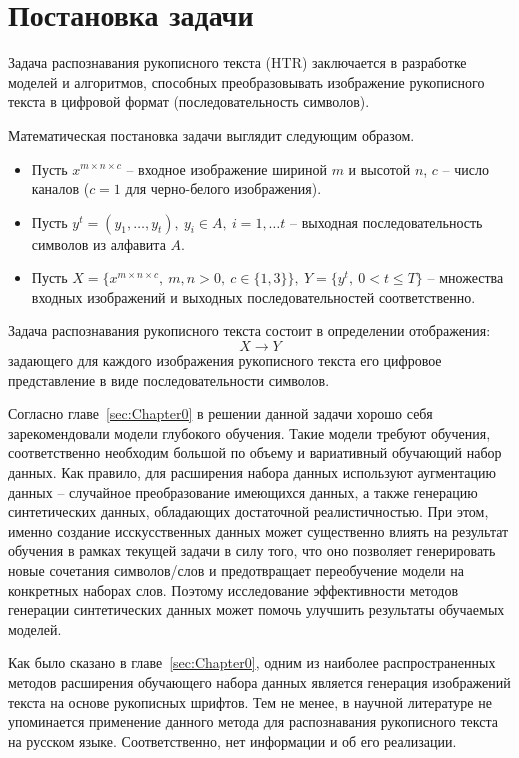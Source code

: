 \section{Постановка задачи}
\label{sec:Chapter1} 

Задача распознавания рукописного текста (HTR) заключается в разработке моделей и алгоритмов,
способных преобразовывать изображение рукописного текста в цифровой формат (последовательность символов).

Математическая постановка задачи выглядит следующим образом.

\begin{itemize}
    \item[] Пусть $x^{m \times n \times c}$ -- входное изображение шириной $m$ и высотой $n$, $c$ -- число каналов ($c=1$ для черно-белого изображения).
    \item[] Пусть $y^t=(y_1,\dots,y_t),~y_i \in A,~i=1,\dots t$ -- выходная последовательность символов из алфавита $A$.
    \item[] Пусть $X=\{x^{m \times n \times c},~m,n>0,~c\in\{1,3\}\},~Y=\{y^t,~0<t\leqslant T\}$ -- множества входных изображений и выходных последовательностей соответственно.
\end{itemize}

Задача распознавания рукописного текста состоит в определении отображения:
\[ X \rightarrow Y \]
задающего для каждого изображения рукописного текста его цифровое представление в виде последовательности символов.

Согласно главе~\ref{sec:Chapter0} в решении данной задачи хорошо себя зарекомендовали модели глубокого обучения.
Такие модели требуют обучения, соответственно необходим большой по объему и вариативный обучающий набор данных.
Как правило, для расширения набора данных используют аугментацию данных -- случайное преобразование имеющихся данных,
а также генерацию синтетических данных, обладающих достаточной реалистичностью.
При этом, именно создание исскусственных данных может существенно влиять на результат обучения в рамках текущей задачи в силу того,
что оно позволяет генерировать новые сочетания символов/слов и предотвращает переобучение модели на конкретных наборах слов.
Поэтому исследование эффективности методов генерации синтетических данных может помочь улучшить результаты обучаемых моделей.

Как было сказано в главе~\ref{sec:Chapter0}, одним из наиболее распространенных методов расширения обучающего набора данных
является генерация изображений текста на основе рукописных шрифтов.
Тем не менее, в научной литературе не упоминается применение данного метода для распознавания рукописного текста на русском языке.
Соответственно, нет информации и об его реализации.

